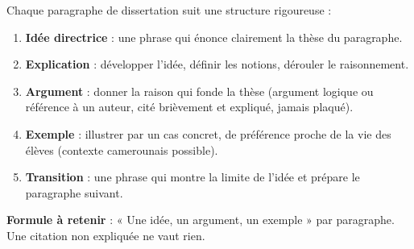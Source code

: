 \documentclass[11pt]{article}
\begin{document}
\begin{methode}
Chaque paragraphe de dissertation suit une structure rigoureuse :
\begin{enumerate}
\item \textbf{Idée directrice} : une phrase qui énonce clairement la thèse du paragraphe.
\item \textbf{Explication} : développer l'idée, définir les notions, dérouler le raisonnement.
\item \textbf{Argument} : donner la raison qui fonde la thèse (argument logique ou référence à un auteur, cité brièvement et expliqué, jamais plaqué).
\item \textbf{Exemple} : illustrer par un cas concret, de préférence proche de la vie des élèves (contexte camerounais possible).
\item \textbf{Transition} : une phrase qui montre la limite de l'idée et prépare le paragraphe suivant.
\end{enumerate}
\textbf{Formule à retenir} : « Une idée, un argument, un exemple » par paragraphe. Une citation non expliquée ne vaut rien.
\end{methode}
\end{document}
